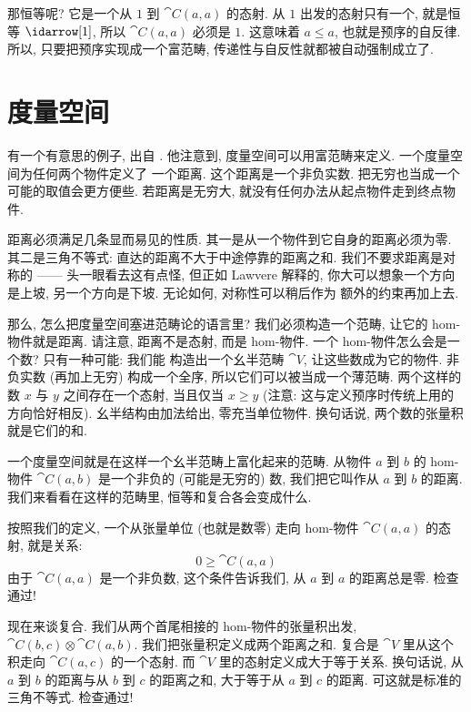 那恒等呢? 它是一个从 $1$ 到 $\cat{C}(a, a)$ 的态射. 从 $1$ 出发的态射只有一个, 就是恒等
$\idarrow[1]$, 所以 $\cat{C}(a, a)$ 必须是 $1$. 这意味着 $a \leqslant a$, 也就是预序的自反律.
所以, 只要把预序实现成一个富范畴, 传递性与自反性就都被自动强制成立了.

\section{度量空间}

有一个有意思的例子, 出自
. 他注意到, 度量空间可以用富范畴来定义. 一个度量空间为任何两个物件定义了
一个距离. 这个距离是一个非负实数. 把无穷也当成一个可能的取值会更方便些. 若距离是无穷大,
就没有任何办法从起点物件走到终点物件.

距离必须满足几条显而易见的性质. 其一是从一个物件到它自身的距离必须为零. 其二是三角不等式:
直达的距离不大于中途停靠的距离之和. 我们不要求距离是对称的 —— 头一眼看去这有点怪, 但正如
Lawvere 解释的, 你大可以想象一个方向是上坡, 另一个方向是下坡. 无论如何, 对称性可以稍后作为
额外的约束再加上去.

那么, 怎么把度量空间塞进范畴论的语言里? 我们必须构造一个范畴, 让它的 hom-物件就是距离.
请注意, 距离不是态射, 而是 hom-物件. 一个 hom-物件怎么会是一个数? 只有一种可能: 我们能
构造出一个幺半范畴 $\cat{V}$, 让这些数成为它的物件. 非负实数 (再加上无穷) 构成一个全序,
所以它们可以被当成一个薄范畴. 两个这样的数 $x$ 与 $y$ 之间存在一个态射, 当且仅当
$x \geqslant y$ (注意: 这与定义预序时传统上用的方向恰好相反). 幺半结构由加法给出,
零充当单位物件. 换句话说, 两个数的张量积就是它们的和.

一个度量空间就是在这样一个幺半范畴上富化起来的范畴. 从物件 $a$ 到 $b$ 的 hom-物件
$\cat{C}(a, b)$ 是一个非负的 (可能是无穷的) 数, 我们把它叫作从 $a$ 到 $b$ 的距离.
我们来看看在这样的范畴里, 恒等和复合各会变成什么.

按照我们的定义, 一个从张量单位 (也就是数零) 走向 hom-物件 $\cat{C}(a, a)$ 的态射, 就是关系:
\[0 \geqslant \cat{C}(a, a)\]
由于 $\cat{C}(a, a)$ 是一个非负数, 这个条件告诉我们, 从 $a$ 到 $a$ 的距离总是零. 检查通过!

现在来谈复合. 我们从两个首尾相接的 hom-物件的张量积出发, $\cat{C}(b, c) \otimes \cat{C}(a, b)$.
我们把张量积定义成两个距离之和. 复合是 $\cat{V}$ 里从这个积走向 $\cat{C}(a, c)$ 的一个态射. 而
$\cat{V}$ 里的态射定义成大于等于关系. 换句话说, 从 $a$ 到 $b$ 的距离与从 $b$ 到 $c$ 的距离之和,
大于等于从 $a$ 到 $c$ 的距离. 可这就是标准的三角不等式. 检查通过!

